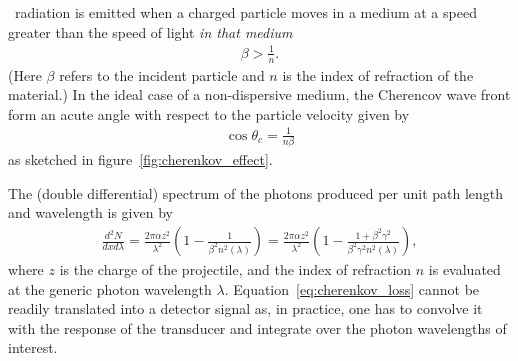\Cheren\ radiation is emitted when a charged particle moves in a medium at a speed
greater than the speed of light \emph{in that medium}
\begin{align}
  \beta > \frac{1}{n}.
\end{align}
(Here $\beta$ refers to the incident particle and $n$ is the index of
refraction of the material.) In the ideal case of a non-dispersive medium, the
Cherencov wave front form an acute angle with respect to the particle velocity
given by
\begin{align}
  \cos\theta_c = \frac{1}{n\beta}
\end{align}
as sketched in figure~\ref{fig:cherenkov_effect}.

The (double differential) spectrum of the photons produced per unit path length
and wavelength is given by
\begin{align}\label{eq:cherenkov_loss}
  \frac{d^2N}{dxd\lambda} = \frac{2\pi\alpha z^2}{\lambda^2}
  \left(1 -  \frac{1}{\beta^2 n^2(\lambda)}\right) =
  \frac{2\pi\alpha z^2}{\lambda^2}
  \left(1 - \frac{1 + \beta^2\gamma^2}{\beta^2\gamma^2n^2(\lambda)}\right),
\end{align}
where $z$ is the charge of the projectile, and the index of refraction $n$
is evaluated at the generic photon wavelength $\lambda$.
Equation~\eqref{eq:cherenkov_loss} cannot be readily translated into a detector
signal as, in practice, one has to convolve it with the response of the
transducer and integrate over the photon wavelengths of interest.

